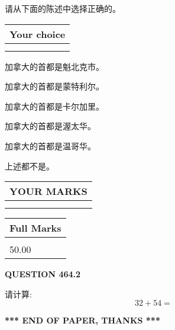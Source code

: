 \documentclass{ctexart}
\begin{document}
  
请从下面的陈述中选择正确的。
  
  
\noindent\hspace{3.0in} \begin{tabular}{|l|}
\hline
Your choice \\
\hline
 \\ 
 \\ 
\hline
\end{tabular}
  
  
 
 
加拿大的首都是魁北克市。
 
 
加拿大的首都是蒙特利尔。
 
 
加拿大的首都是卡尔加里。
 
 
加拿大的首都是渥太华。
 
 
加拿大的首都是温哥华。
 
 
 上述都不是。
 
 
  
\vspace{0.2in}
  
\noindent\begin{tabular}{|l|}
\hline
 YOUR MARKS  \\
\hline
 \\ 
 \\ 
\hline
\end{tabular}
\hspace{0.05in} \begin{tabular}{|l|}
\hline
 Full Marks  \\
\hline
 \\ 
50.00 \\
\hline
\end{tabular}
{\textbf{\Large{QUESTION
464.2 
}}}
  
  
 
请计算:
\begin{equation}
32 +  %
54 = \nonumber
\end{equation}
 

 

 
   
   
 \vspace{0.2in}
 
   
   
   
   
\vspace{1.0in} 
{\textbf{\large{ *** END OF PAPER, THANKS *** }}} 
   
\end{document}
